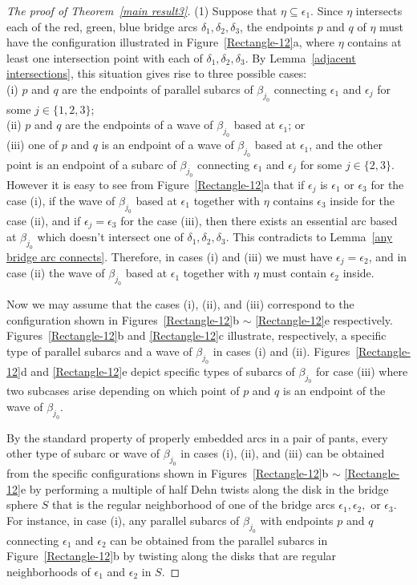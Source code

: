 \documentclass[12pt]{amsart}
\newcommand{\be}{\beta}
\newcommand{\ep}{\epsilon}
\newcommand{\del}{\delta}
\begin{document}
\begin{proof}[The proof of Theorem~\emph{\ref{main result3}}]
(1) Suppose that $\eta\subseteq \ep_1$. Since $\eta$ intersects each of the red, green, blue bridge arcs $\del_1, \del_2, \del_3$,
the endpoints $p$ and $q$ of $\eta$ must have the configuration illustrated in Figure~\ref{Rectangle-12}a, where
$\eta$ contains at least one intersection point with each of $\del_1, \del_2, \del_3$.
By Lemma~\ref{adjacent intersections}, this situation gives rise to three possible cases:\\

\noindent(i) $p$ and $q$ are the endpoints of parallel subarcs of $\be_{j_0}$ connecting $\ep_1$ and $\ep_j$ for some $j\in\{1, 2, 3\}$;\\
(ii) $p$ and $q$ are the endpoints of a wave of $\be_{j_0}$ based at $\ep_{1}$; or\\
(iii) one of $p$ and $q$ is an endpoint of a wave of $\be_{j_0}$ based at $\ep_{1}$, and the other point is an endpoint of a subarc of $\be_{j_0}$ connecting $\ep_{1}$ and $\ep_j$ for some $j\in\{2, 3\}$. \\


\noindent However it is easy to see from Figure~\ref{Rectangle-12}a that if $\ep_j$ is $\ep_1$ or $\ep_3$ for the case (i), if the wave of $\be_{j_0}$ based at $\ep_{1}$ together with $\eta$ contains $\ep_3$ inside for the case (ii), and if $\ep_j=\ep_3$ for the case (iii), then there exists an essential arc based at $\be_{j_0}$ which doesn't intersect one of $\del_1, \del_2, \del_3$. This contradicts to Lemma~\ref{any bridge arc connects}. Therefore, in cases (i) and (iii) we must have $\ep_j=\ep_2$, and in case (ii) the wave of $\beta_{j_0}$ based at $\ep_1$ together with $\eta$ must contain $\ep_2$ inside.


Now we may assume that the cases (i), (ii), and (iii) correspond to the configuration shown in Figures~\ref{Rectangle-12}b $\sim$ \ref{Rectangle-12}e respectively. Figures~\ref{Rectangle-12}b and \ref{Rectangle-12}c illustrate, respectively, a specific type of parallel subarcs and a wave of $\beta_{j_0}$ in cases (i) and (ii). Figures~\ref{Rectangle-12}d and \ref{Rectangle-12}e depict specific types of subarcs of $\be_{j_0}$ for case (iii) where two subcases arise depending on which point of $p$ and $q$ is an endpoint of the wave of $\be_{j_0}$.


By the standard property of properly embedded arcs in a pair of pants, every other type of subarc or wave of $\beta_{j_0}$ in cases (i), (ii), and (iii) can be obtained from the specific configurations shown in Figures~\ref{Rectangle-12}b $\sim$ \ref{Rectangle-12}e by performing a multiple of half Dehn twists along the disk in the bridge sphere $S$ that is the regular neighborhood of one of the bridge arcs $\ep_1, \ep_2,$ or $\ep_3$. For instance, in case (i), any parallel subarcs of $\be_{j_0}$ with endpoints $p$ and $q$ connecting $\ep_1$ and $\ep_2$ can be obtained from the parallel subarcs in Figure~\ref{Rectangle-12}b by
twisting along the disks that are regular neighborhoods of $\ep_1$ and $\ep_2$ in $S$.



\end{proof}
\end{document}
